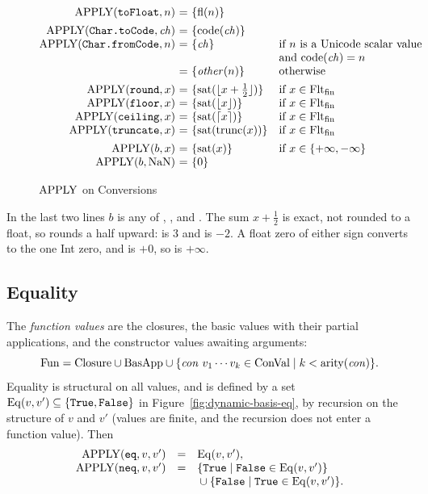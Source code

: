 \begin{figure}[htbp]
\centering
\small
\[
\begin{array}{@{}r@{\ }c@{\ }l@{\quad}l@{}}
\APPLY(\kw{toFloat},n) & = & \{\dbfl(n)\} & \\[1ex]
\APPLY(\kw{Char.toCode},\dbch) & = & \{\dbcode(\dbch)\} & \\
\APPLY(\kw{Char.fromCode},n) & = & \{\dbch\} & \text{if}\ n\ \text{is a Unicode scalar value}\\
                              &   &            & \text{and}\ \dbcode(\dbch)=n\\
                              & = & \{\mathit{other}(n)\} & \text{otherwise}\\[1ex]
\APPLY(\kw{round},x) & = & \{\dbsat(\lfloor x+\tfrac{1}{2}\rfloor)\} & \text{if}\ x\in\effFltFin\\
\APPLY(\kw{floor},x) & = & \{\dbsat(\lfloor x\rfloor)\} & \text{if}\ x\in\effFltFin\\
\APPLY(\kw{ceiling},x) & = & \{\dbsat(\lceil x\rceil)\} & \text{if}\ x\in\effFltFin\\
\APPLY(\kw{truncate},x) & = & \{\dbsat(\dbtrunc(x))\} & \text{if}\ x\in\effFltFin\\[1ex]
\APPLY(b,x) & = & \{\dbsat(x)\} & \text{if}\ x\in\{+\infty,-\infty\}\\
\APPLY(b,\dbNaN) & = & \{0\} &
\end{array}
\]
\caption{$\mathrm{APPLY}$ on Conversions}\label{fig:dynamic-basis-conv}
\end{figure}

In the last two lines $b$ is any of , ,  and
. The sum $x+\frac{1}{2}$ is exact, not rounded to a float, so
 rounds a half upward:  is $3$ and  is
$-2$. A float zero of either sign converts to the one Int zero, and
 is $+0$, so  is $+\infty$. %

\subsection{Equality}\label{sec:appendix-dynamic-basis-eq}

The \emph{function values} are the closures, the basic values with their
partial applications, and the constructor values awaiting arguments:
\[
  \mathrm{Fun}=\mathrm{Closure}\cup\mathrm{BasApp}\cup\{\mathit{con}\ v_1\cdots v_k\in\mathrm{ConVal}\mid k<\mathrm{arity}(\mathit{con})\}.
\]
Equality is structural on all values, and is defined by a set
$\mathrm{Eq}(v,v')\subseteq\{\textnormal{\texttt{True}},\textnormal{\texttt{False}}\}$ in
Figure~\ref{fig:dynamic-basis-eq}, by recursion on the structure of $v$ and
$v'$ (values are finite, and the recursion does not enter a function value).
Then
\[
  \begin{array}{rcl}
  \mathrm{APPLY}(\textnormal{\texttt{eq}},v,v') &=& \mathrm{Eq}(v,v'),\\
  \mathrm{APPLY}(\textnormal{\texttt{neq}},v,v') &=& \{\textnormal{\texttt{True}}\mid\textnormal{\texttt{False}}\in\mathrm{Eq}(v,v')\}\\
  &&{}\cup\{\textnormal{\texttt{False}}\mid\textnormal{\texttt{True}}\in\mathrm{Eq}(v,v')\}.
  \end{array}
\]


